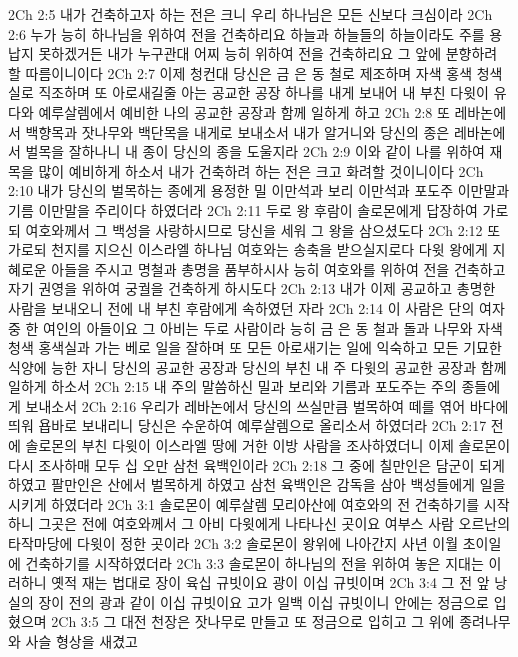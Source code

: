 2Ch 2:5  내가 건축하고자 하는 전은 크니 우리 하나님은 모든 신보다 크심이라
2Ch 2:6  누가 능히 하나님을 위하여 전을 건축하리요 하늘과 하늘들의 하늘이라도 주를 용납지 못하겠거든 내가 누구관대 어찌 능히 위하여 전을 건축하리요 그 앞에 분향하려 할 따름이니이다
2Ch 2:7  이제 청컨대 당신은 금 은 동 철로 제조하며 자색 홍색 청색실로 직조하며 또 아로새길줄 아는 공교한 공장 하나를 내게 보내어 내 부친 다윗이 유다와 예루살렘에서 예비한 나의 공교한 공장과 함께 일하게 하고
2Ch 2:8  또 레바논에서 백향목과 잣나무와 백단목을 내게로 보내소서 내가 알거니와 당신의 종은 레바논에서 벌목을 잘하나니 내 종이 당신의 종을 도울지라
2Ch 2:9  이와 같이 나를 위하여 재목을 많이 예비하게 하소서 내가 건축하려 하는 전은 크고 화려할 것이니이다
2Ch 2:10  내가 당신의 벌목하는 종에게 용정한 밀 이만석과 보리 이만석과 포도주 이만말과 기름 이만말을 주리이다 하였더라
2Ch 2:11  두로 왕 후람이 솔로몬에게 답장하여 가로되 여호와께서 그 백성을 사랑하시므로 당신을 세워 그 왕을 삼으셨도다
2Ch 2:12  또 가로되 천지를 지으신 이스라엘 하나님 여호와는 송축을 받으실지로다 다윗 왕에게 지혜로운 아들을 주시고 명철과 총명을 품부하시사 능히 여호와를 위하여 전을 건축하고 자기 권영을 위하여 궁궐을 건축하게 하시도다
2Ch 2:13  내가 이제 공교하고 총명한 사람을 보내오니 전에 내 부친 후람에게 속하였던 자라
2Ch 2:14  이 사람은 단의 여자 중 한 여인의 아들이요 그 아비는 두로 사람이라 능히 금 은 동 철과 돌과 나무와 자색 청색 홍색실과 가는 베로 일을 잘하며 또 모든 아로새기는 일에 익숙하고 모든 기묘한 식양에 능한 자니 당신의 공교한 공장과 당신의 부친 내 주 다윗의 공교한 공장과 함께 일하게 하소서
2Ch 2:15  내 주의 말씀하신 밀과 보리와 기름과 포도주는 주의 종들에게 보내소서
2Ch 2:16  우리가 레바논에서 당신의 쓰실만큼 벌목하여 떼를 엮어 바다에 띄워 욥바로 보내리니 당신은 수운하여 예루살렘으로 올리소서 하였더라
2Ch 2:17  전에 솔로몬의 부친 다윗이 이스라엘 땅에 거한 이방 사람을 조사하였더니 이제 솔로몬이 다시 조사하매 모두 십 오만 삼천 육백인이라
2Ch 2:18  그 중에 칠만인은 담군이 되게 하였고 팔만인은 산에서 벌목하게 하였고 삼천 육백인은 감독을 삼아 백성들에게 일을 시키게 하였더라
2Ch 3:1  솔로몬이 예루살렘 모리아산에 여호와의 전 건축하기를 시작하니 그곳은 전에 여호와께서 그 아비 다윗에게 나타나신 곳이요 여부스 사람 오르난의 타작마당에 다윗이 정한 곳이라
2Ch 3:2  솔로몬이 왕위에 나아간지 사년 이월 초이일에 건축하기를 시작하였더라
2Ch 3:3  솔로몬이 하나님의 전을 위하여 놓은 지대는 이러하니 옛적 재는 법대로 장이 육십 규빗이요 광이 이십 규빗이며
2Ch 3:4  그 전 앞 낭실의 장이 전의 광과 같이 이십 규빗이요 고가 일백 이십 규빗이니 안에는 정금으로 입혔으며
2Ch 3:5  그 대전 천장은 잣나무로 만들고 또 정금으로 입히고 그 위에 종려나무와 사슬 형상을 새겼고
